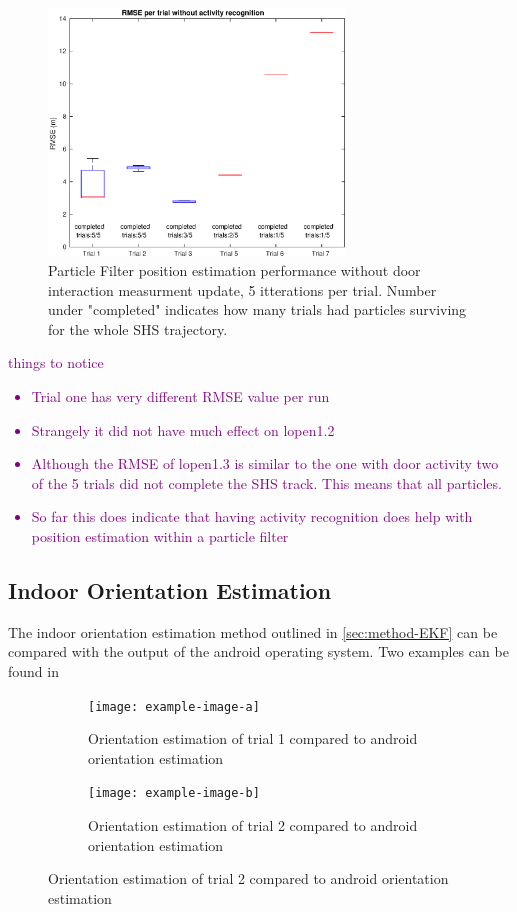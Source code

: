 \begin{figure}[H]
	\centering
	\includegraphics[width=0.7\textwidth]{images/20201116_1333_RMSE_per_trial_without_activity_recognition}
	\caption[Particle Filter position estimation performance without door interaction]{Particle Filter position estimation performance without door interaction measurment update, 5 itterations per trial. Number under "completed" indicates how many trials had particles surviving for the whole SHS trajectory.}
	\label{fig:pf_boxplot_no_doors}
\end{figure}

\textcolor{purple}{
	things to notice
	\begin{itemize}
		\item Trial one has very different RMSE value per run
		\item Strangely it did not have much effect on lopen1.2
		\item Although the RMSE of lopen1.3 is similar to the one with door activity two of the 5 trials did not complete the SHS track. This means that all particles.
		\item So far this does indicate that having activity recognition does help with position estimation within a particle filter
\end{itemize}}


\subsection{Indoor Orientation Estimation}
The indoor orientation estimation method outlined in \cref{sec:method-EKF} can be compared with the output of the android operating system. Two examples can be found in 

\begin{figure}[H]
	\centering
	\begin{subfigure}[t]{.45\textwidth}
	\centering
	\texttt{[image: example-image-a]}
	\caption{Orientation estimation of trial 1 compared to android orientation estimation}
	\label{fig:trail1 - shs}
\end{subfigure}\quad
\begin{subfigure}[t]{.45\textwidth}
	\centering
	\texttt{[image: example-image-b]}
	\caption{Orientation estimation of trial 2 compared to android orientation estimation}
	\label{fig:trail2 - shs}
\end{subfigure}
\end{figure}

